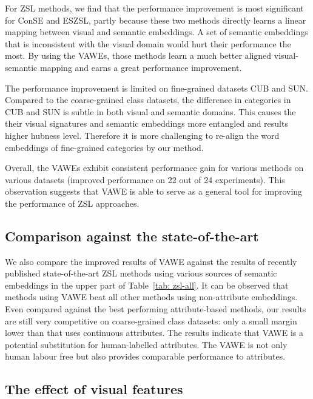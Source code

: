 \documentclass{bmvc2k}
\begin{document}
For ZSL methods, we find that the performance improvement is most significant for ConSE and ESZSL, partly because these two methods directly learns a linear mapping between visual and semantic embeddings. A set of semantic embeddings that is inconsistent with the visual domain would hurt their performance the most. By using the VAWEs, those methods learn a much better aligned visual-semantic mapping and earns a great performance improvement. %

The performance improvement is limited on fine-grained datasets CUB and SUN. Compared to the coarse-grained class datasets, the difference in categories in CUB and SUN is subtle in both visual and semantic domains. This causes the their visual signatures and semantic embeddings more entangled and results higher hubness level. Therefore it is more challenging to re-align the word embeddings of fine-grained categories by our method.

Overall, the VAWEs exhibit consistent performance gain for various methods on various datasets (improved performance on 22 out of 24 experiments). This observation suggests that VAWE is able to serve as a general tool for improving the performance of ZSL approaches.

\subsection{Comparison against the state-of-the-art}
We also compare the improved results of VAWE against the results of recently published state-of-the-art ZSL methods using various sources of semantic embeddings in the upper part of Table~\ref{tab: zsl-all}. It can be observed that methods using VAWE beat all other methods using non-attribute embeddings. Even compared against the best performing attribute-based methods, our results are still very competitive on coarse-grained class datasets: only a small margin lower than \cite{Zhang2016CVPR} that uses continuous attributes. The results indicate that VAWE is a potential substitution for human-labelled attributes. The VAWE is not only human labour free but also provides comparable performance to attributes.

%

%
%
%
%
%
%
%
%
%
%
%
%
%
%
%
%
%
%
%
%
%
%
%
%
%
%
%
%
%
%
%
%
%
%
%

%

\subsection{The effect of visual features}
\end{document}
